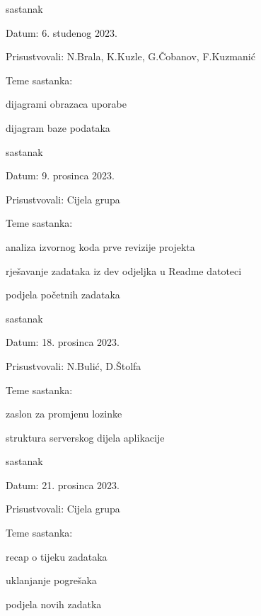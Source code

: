 \begin{packed_enum}
			\item  sastanak
			\item[] \begin{packed_item}
				\item Datum: 6. studenog 2023.
				\item Prisustvovali: N.Brala, K.Kuzle, G.Čobanov, F.Kuzmanić
				\item Teme sastanka:
				\begin{packed_item}
					\item  dijagrami obrazaca uporabe
					\item  dijagram baze podataka
				\end{packed_item}
			\end{packed_item}

			\item  sastanak
			\item[] \begin{packed_item}
				\item Datum: 9. prosinca 2023.
				\item Prisustvovali: Cijela grupa
				\item Teme sastanka:
				\begin{packed_item}
					\item  analiza izvornog koda prve revizije projekta
					\item  rješavanje zadataka iz dev odjeljka u Readme datoteci
					\item  podjela početnih zadataka
				\end{packed_item}
			\end{packed_item}

			\item  sastanak
			\item[] \begin{packed_item}
				\item Datum: 18. prosinca 2023.
				\item Prisustvovali: N.Bulić, D.Štolfa
				\item Teme sastanka:
				\begin{packed_item}
					\item  zaslon za promjenu lozinke
					\item  struktura serverskog dijela aplikacije
				\end{packed_item}
			\end{packed_item}

			\item  sastanak
			\item[] \begin{packed_item}
				\item Datum: 21. prosinca 2023.
				\item Prisustvovali: Cijela grupa
				\item Teme sastanka:
				\begin{packed_item}
					\item  recap o tijeku zadataka
					\item  uklanjanje pogrešaka
					\item  podjela novih zadatka
				\end{packed_item}
			\end{packed_item}


\end{packed_enum}
